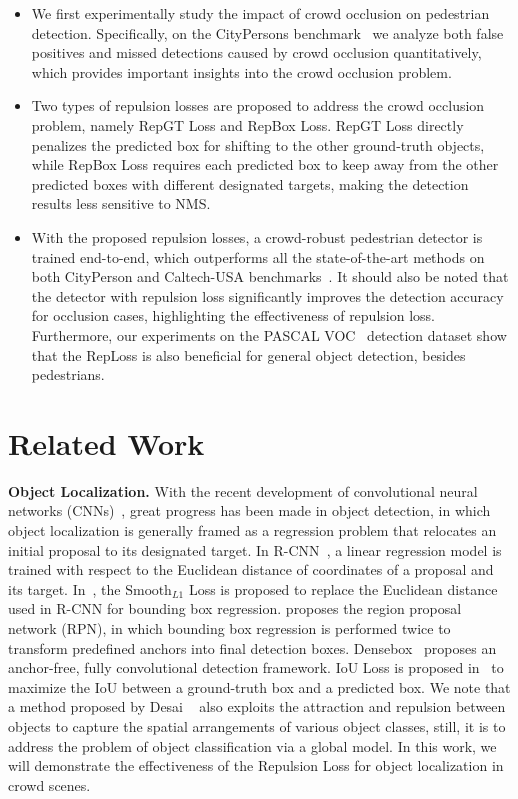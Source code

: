 \documentclass[10pt,twocolumn,letterpaper]{article}
\newcommand{\myparagraph}[1]{{\vspace{0.5em} \noindent \bf #1}}
\begin{document}
\begin{itemize}
\setlength{\itemsep}{0pt}
\setlength{\parskip}{0pt}
\setlength{\parsep}{0pt}
  \item We first experimentally study the impact of crowd occlusion on pedestrian detection. Specifically, on the CityPersons benchmark~\cite{zhang2017citypersons} we analyze both false positives and missed detections caused by crowd occlusion quantitatively, which provides important insights into the crowd occlusion problem.
  \item Two types of repulsion losses are proposed to address the crowd occlusion problem, namely RepGT Loss and RepBox Loss. RepGT Loss directly penalizes the predicted box for shifting to the other ground-truth objects, while RepBox Loss requires each predicted box to keep away from the other predicted boxes with different designated targets, making the detection results less sensitive to NMS.
  \item With the proposed repulsion losses, a crowd-robust pedestrian detector is trained end-to-end, which outperforms all the state-of-the-art methods on both CityPerson and Caltech-USA benchmarks~\cite{dollar2009pedestrian}. It should also be noted that the detector with repulsion loss significantly improves the detection accuracy for occlusion cases, highlighting the effectiveness of repulsion loss. Furthermore, our experiments on the PASCAL VOC~\cite{everingham2010pascal} detection dataset show that the RepLoss is also beneficial for general object detection, besides pedestrians. 
\end{itemize}

\section{Related Work}


\myparagraph{Object Localization.} With the recent development of convolutional neural networks (CNNs)~\cite{krizhevsky2012imagenet,simonyan2014very,he2016deep}, great progress has been made in object detection, in which object localization is generally framed as a regression problem that relocates an initial proposal to its designated target. In R-CNN~\cite{Girshick_2014_CVPR}, a linear regression model is trained with respect to the Euclidean distance of coordinates of a proposal and its target. In~\cite{Girshick_2015_ICCV}, the $\mathrm{Smooth}_{L1}$ Loss is proposed to replace the Euclidean distance used in R-CNN for bounding box regression. \cite{NIPS2015_5638} proposes the region proposal network (RPN), in which bounding box regression is performed twice to transform predefined anchors into final detection boxes. Densebox~\cite{huang2015densebox} proposes an anchor-free, fully convolutional detection framework. IoU Loss is proposed in~\cite{yu2016unitbox} to maximize the IoU between a ground-truth box and a predicted box.  We note that a method proposed by Desai \etal~\cite{desai2011discriminative} also exploits  the attraction and repulsion between objects to capture the spatial arrangements of various object classes, still, it is to address the problem of object classification via a global model. In this work, we will demonstrate the effectiveness of the Repulsion Loss for object localization in crowd scenes.
\end{document}
